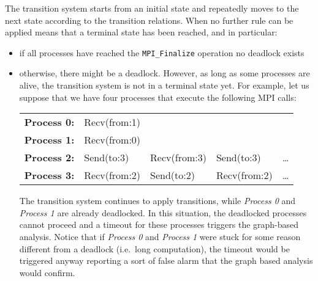 \begin{refsection}
The transition system starts from an initial state and repeatedly moves to the
next state according to the transition relations.
%
When no further rule can be applied means that a terminal state has been
reached, and in particular:

\begin{itemize}
\item if all processes have reached the \texttt{MPI\_Finalize} operation no
  deadlock exists
\item otherwise, there might be a deadlock.
  However, as long as some processes are alive, the transition system is not
  in a terminal state yet.
  For example, let us suppose that we have four processes that execute the
  following MPI calls:


    \begin{table}[H]
    \centering
    \begin{tabular}{l l l l l}
      \textbf{Process 0:} & Recv(from:1) & & \\
      \textbf{Process 1:} & Recv(from:0) & & \\
      \textbf{Process 2:} & Send(to:3) & Recv(from:3) & Send(to:3) & \dots \\
      \textbf{Process 3:} & Recv(from:2) & Send(to:2) & Recv(from:2) & \dots \\
    \end{tabular}
  \end{table}

  The transition system continues to apply transitions, while \emph{Process 0}
  and \emph{Process 1} are already deadlocked.
  In this situation, the deadlocked processes cannot proceed and a timeout for
  these processes triggers the graph-based analysis.
  Notice that if \emph{Process 0} and \emph{Process 1} were stuck for some
  reason different from a deadlock (i.e.\ long computation), the timeout would
  be triggered anyway reporting a sort of false alarm that the graph based
  analysis would confirm.
\end{itemize}


\end{refsection}
